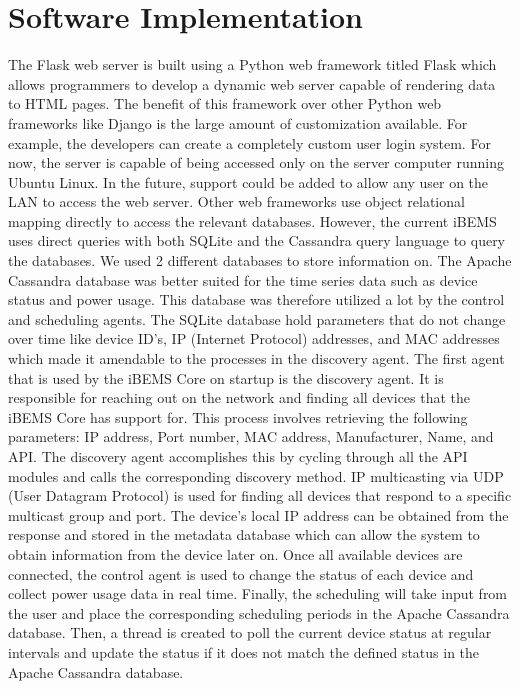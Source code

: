 \documentclass[conference]{IEEEtran}
\begin{document}
\section{Software Implementation}
\label{sec:SoftwareImplementation}
The Flask web server is built using a Python web framework titled Flask which
allows programmers to develop a dynamic web server capable of rendering data to
HTML pages. The benefit of this framework over other Python web frameworks like
Django is the large amount of customization available. For example, the
developers can create a completely custom user login system. For now, the server
is capable of being accessed only on the server computer running Ubuntu Linux.
In the future, support could be added to allow any user on the LAN to access the
web server. Other web frameworks use object relational mapping directly to
access the relevant databases. However, the current iBEMS uses direct queries with both
SQLite and the Cassandra query language to query the databases. We used
2 different databases to store information on. The Apache Cassandra database was
better suited for the time series data such as device status and power usage.
This database was therefore utilized a lot by the control and scheduling agents.
The SQLite database hold parameters that do not change over time like device
ID's, IP (Internet Protocol) addresses, and MAC addresses which made it amendable to the processes
in the discovery agent. The first agent that is
used by the iBEMS Core on startup is the discovery agent. It is responsible for
reaching out on the network and finding all devices that the iBEMS Core has
support for. This process involves retrieving the following parameters: IP
address, Port number, MAC address, Manufacturer, Name, and API. The discovery agent accomplishes this by cycling through all the API modules and calls the corresponding discovery method. IP multicasting via UDP (User Datagram Protocol) is used for finding all devices that respond to a specific multicast group and port. The device's local IP address can be obtained from the response and stored in the metadata database which can allow the system to obtain information from the device later on. Once all
available devices are connected, the control agent is used to change the status
of each device and collect power usage data in real time. Finally, the
scheduling will take input from the user and place the corresponding scheduling
periods in the Apache Cassandra database. Then, a thread is created to poll the
current device status at regular intervals and update the status if it does not
match the defined status in the Apache Cassandra database.
\end{document}
